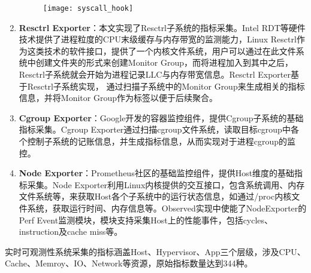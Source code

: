 \begin{enumerate}
    \begin{figure}[H]
        \centering
        \texttt{[image: syscall\_hook]}
        \label{fig:syscall_hook}
    \end{figure}

    \item \textbf{Resctrl Exporter}：本文实现了Resctrl子系统的指标采集。Intel RDT等硬件技术提供了进程粒度的CPU末级缓存与内存带宽的监测能力，Linux Resctrl作为这类技术的软件接口，提供了一个内核文件系统，用户可以通过在此文件系统中创建文件夹的形式来创建Monitor Group，而将进程加入到其中之后，Resctrl子系统就会开始为进程记录LLC与内存带宽信息。Resctrl Exporter基于Resctrl子系统实现， 通过扫描子系统中的Monitor Group来生成相关的指标信息，并将Monitor Group作为标签以便于后续聚合。
    
    \item \textbf{Cgroup Exporter}：Google开发的容器监控组件，提供Cgroup子系统的基础指标采集。Cgroup Exporter通过扫描cgroup文件系统，读取目标cgroup中各个控制子系统的记账信息，并生成指标信息，从而实现对于进程cgroup的监控。
    
    \item \textbf{Node Exporter}：Prometheus社区的基础监控组件，提供Host维度的基础指标采集。Node Exporter利用Linux内核提供的交互接口，包含系统调用、内存文件系统等，来获取Host各个子系统中的运行状态信息，如通过/proc内核文件系统，获取运行时间、内存信息等。Observed实现中使能了NodeExporter的Perf Event监测模块，模块支持采集Host上的性能事件，包括cycles、instruction及cache miss等。

\end{enumerate}


实时可观测性系统采集的指标涵盖Host、Hypervisor、App三个层级，涉及CPU、Cache、Memroy、IO、Network等资源，原始指标数量达到344种。

